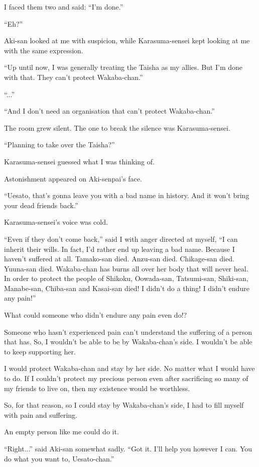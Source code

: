 I faced them two and said: ``I'm done.''

``Eh?''

Aki-san looked at me with suspicion, while Karasuma-sensei kept looking at me with the same expression.

``Up until now, I was generally treating the Taisha as my allies. But I'm done with that. They can't protect Wakaba-chan.''

``...''

``And I don't need an organisation that can't protect Wakaba-chan.''

The room grew silent. The one to break the silence was Karasuma-sensei.

``Planning to take over the Taisha?''

Karasuma-sensei guessed what I was thinking of.

Astonishment appeared on Aki-senpai's face.

``Uesato, that's gonna leave you with a bad name in history. And it won't bring your dead friends back.''

Karasuma-sensei's voice was cold.

``Even if they don't come back,'' said I with anger directed at myself, ``I can inherit their wills. In fact, I'd rather end up leaving a bad name. Because I haven't suffered at all. Tamako-san died. Anzu-san died. Chikage-san died. Yuuna-san died. Wakaba-chan has burns all over her body that will never heal. In order to protect the people of Shikoku, Oowada-san, Tatsumi-san, Shiki-san, Manabe-san, Chiba-san and Kasai-san died! I didn't do a thing! I didn't endure any pain!''

What could someone who didn't endure any pain even do!?

Someone who hasn't experienced pain can't understand the suffering of a person that has. So, I wouldn't be able to be by Wakaba-chan's side. I wouldn't be able to keep supporting her.

I would protect Wakaba-chan and stay by her side. No matter what I would have to do. If I couldn't protect my precious person even after sacrificing so many of my friends to live on, then my existence would be worthless.

So, for that reason, so I could stay by Wakaba-chan's side, I had to fill myself with pain and suffering.

An empty person like me could do it.

``Right...'' said Aki-san somewhat sadly.  ``Got it. I'll help you however I can. You do what you want to, Uesato-chan.''

